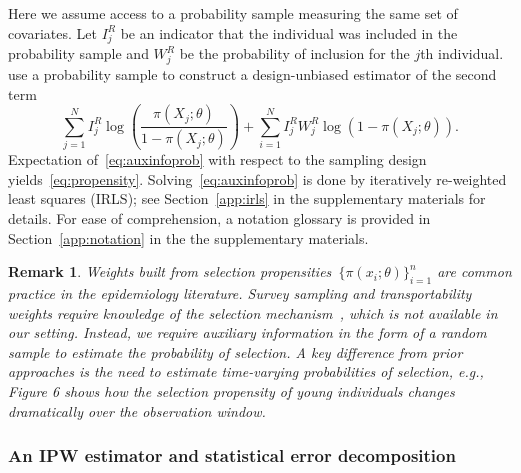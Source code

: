 \documentclass[11pt]{amsart}
\numberwithin{equation}{section}
\theoremstyle{plain}
\newtheorem{remark}{Remark}
\begin{document}
 Here we assume access to a probability sample measuring the same set of covariates.  Let $I_j^{R}$ be an indicator that the individual was included in the probability sample and $W_j^R$ be the probability of inclusion for the $j$th individual. \cite{Chen2019} use a probability sample to construct a design-unbiased estimator of the second term
 \begin{equation}
 \label{eq:auxinfoprob}
 \sum_{j=1}^N I_j^R \log \left( \frac{\pi (X_j; \theta)}{1-\pi(X_j; \theta)} \right)  + \sum_{i=1}^N I_j^R W_j^R \log ( 1 - \pi (X_j; \theta)).
 \end{equation}
 Expectation of~\ref{eq:auxinfoprob} with respect to the sampling design yields~\eqref{eq:propensity}. Solving~\eqref{eq:auxinfoprob} is done by iteratively re-weighted least squares (IRLS); see Section~\ref{app:irls} in the supplementary materials for details.  For ease of comprehension, a notation glossary is provided in Section~\ref{app:notation} in the the supplementary materials.

 \begin{remark}
 Weights built from selection propensities~$\{\pi(x_i; \theta)\}_{i=1}^n$ are common practice in the epidemiology literature.  Survey sampling and transportability weights require knowledge of the selection mechanism~\citep{10.1093/aje/kwx164,ColeStuart2010}, which is not available in our setting.  Instead, we require auxiliary information in the form of a random sample to estimate the probability of selection. A key difference from prior approaches is the need to estimate time-varying probabilities of selection, e.g., Figure 6 shows how the selection propensity of young individuals changes dramatically over the observation window.
 \end{remark}




 \subsubsection{An IPW estimator and statistical error decomposition}
 \label{section:IPWerrordecomp}
\end{document}
